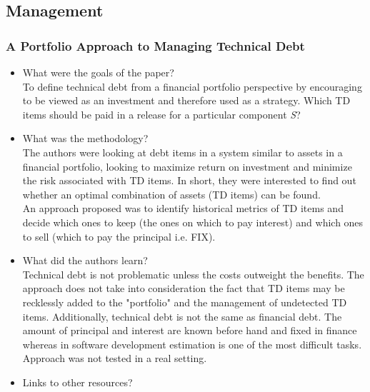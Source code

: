 \documentclass{mprop}
\begin{document}
\subsection{Management}

\subsubsection{A Portfolio Approach to Managing Technical Debt} \cite{Guo2011}

\begin{itemize}
	\item What were the goals of the paper?\\
	      To define technical debt from a financial portfolio perspective by
	      encouraging to be viewed as an investment and therefore used as a
	      strategy. Which TD items should be paid in a release for a
	      particular component \textit{S}?
	\item What was the methodology?\\
	      The authors were looking at debt items in a system similar to assets
	      in a financial portfolio, looking to maximize return on investment
	      and minimize the risk associated with TD items. In short, they were
	      interested to find out whether an optimal combination of assets (TD
	      items) can be found. \\
	      An approach proposed was to identify historical metrics of TD items
	      and decide which ones to keep (the ones on which to pay interest)
	      and which ones to sell (which to pay the principal i.e. FIX).
	\item What did the authors learn? \\
	      Technical debt is not problematic unless the costs outweight the
	      benefits. The approach does not take into consideration the fact
	      that TD items may be recklessly added to the "portfolio" and the
	      management of undetected TD items. Additionally, technical debt is
	      not the same as financial debt. The amount of principal and interest
	      are known before hand and fixed in finance whereas in software
	      development estimation is one of the most difficult tasks. Approach
	      was not tested in a real setting.
	\item Links to other resources?
\end{itemize}
\end{document}
